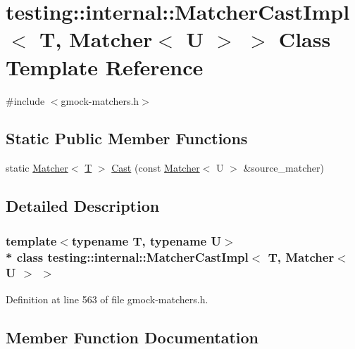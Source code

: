 \hypertarget{classtesting_1_1internal_1_1_matcher_cast_impl_3_01_t_00_01_matcher_3_01_u_01_4_01_4}{}\section{testing\+:\+:internal\+:\+:Matcher\+Cast\+Impl$<$ T, Matcher$<$ U $>$ $>$ Class Template Reference}
\label{classtesting_1_1internal_1_1_matcher_cast_impl_3_01_t_00_01_matcher_3_01_u_01_4_01_4}


{\ttfamily \#include $<$gmock-\/matchers.\+h$>$}

\subsection*{Static Public Member Functions}
\begin{DoxyCompactItemize}
\item 
static \hyperlink{classtesting_1_1_matcher}{Matcher}$<$ \hyperlink{functions__7_8js_adf1f3edb9115acb0a1e04209b7a9937b}{T} $>$ \hyperlink{classtesting_1_1internal_1_1_matcher_cast_impl_3_01_t_00_01_matcher_3_01_u_01_4_01_4_a913a41264cc05c1fd261ee0cf1ede6fe}{Cast} (const \hyperlink{classtesting_1_1_matcher}{Matcher}$<$ U $>$ \&source\+\_\+matcher)
\end{DoxyCompactItemize}


\subsection{Detailed Description}
\subsubsection*{template$<$typename T, typename U$>$\\*
class testing\+::internal\+::\+Matcher\+Cast\+Impl$<$ T, Matcher$<$ U $>$ $>$}



Definition at line 563 of file gmock-\/matchers.\+h.



\subsection{Member Function Documentation}
